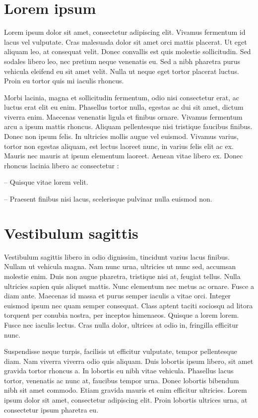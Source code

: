 \chapter{Lorem ipsum}

Lorem ipsum dolor sit amet, consectetur adipiscing elit. Vivamus fermentum id lacus vel vulputate. Cras malesuada dolor sit amet orci mattis placerat. Ut eget aliquam leo, at consequat velit. Donec convallis est quis molestie sollicitudin. Sed sodales libero leo, nec pretium neque venenatis eu. Sed a nibh pharetra purus vehicula eleifend eu sit amet velit. Nulla ut neque eget tortor placerat luctus. Proin eu tortor quis mi iaculis rhoncus.

Morbi lacinia, magna et sollicitudin fermentum, odio nisi consectetur erat, ac luctus erat elit eu enim. Phasellus tortor nulla, egestas ac dui sit amet, dictum viverra enim. Maecenas venenatis ligula et finibus ornare. Vivamus fermentum arcu a ipsum mattis rhoncus. Aliquam pellentesque nisi tristique faucibus finibus. Donec non ipsum felis. In ultricies mollis augue vel euismod. Vivamus varius, tortor non egestas aliquam, est lectus laoreet nunc, in varius felis elit ac ex. Mauris nec mauris at ipsum elementum laoreet. Aenean vitae libero ex. Donec rhoncus lacinia libero ac consectetur :

\divider

-- Quisque vitae lorem velit.

-- Praesent finibus nisi lacus, scelerisque pulvinar nulla euismod non.

\chapter{Vestibulum sagittis}

Vestibulum sagittis libero in odio dignissim, tincidunt varius lacus finibus. Nullam ut vehicula magna. Nam nunc urna, ultricies ut nunc sed, accumsan molestie enim. Duis non augue pharetra, tristique nisi at, feugiat tellus. Nulla ultricies sapien quis aliquet mattis. Nunc elementum nec metus ac ornare. Fusce a diam ante. Maecenas id massa et purus semper iaculis a vitae orci. Integer euismod ipsum nec quam semper consequat. Class aptent taciti sociosqu ad litora torquent per conubia nostra, per inceptos himenaeos. Quisque a lorem lorem. Fusce nec iaculis lectus. Cras nulla dolor, ultrices at odio in, fringilla efficitur nunc.

\divider

Suspendisse neque turpis, facilisis ut efficitur vulputate, tempor pellentesque diam. Nam viverra viverra odio quis aliquam. Duis lobortis ipsum libero, sit amet gravida tortor rhoncus a. In lobortis eu nibh vitae vehicula. Phasellus lacus tortor, venenatis ac nunc at, faucibus tempor urna. Donec lobortis bibendum nibh sit amet commodo. Etiam gravida mauris et enim efficitur ultricies. Lorem ipsum dolor sit amet, consectetur adipiscing elit. Proin lobortis ultrices urna, at consectetur ipsum pharetra eu.

